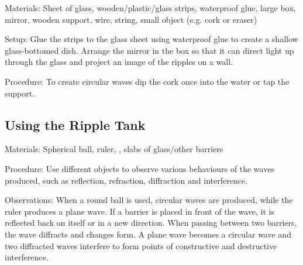 \begin{multicols}{2}
\begin{description*}
\item[Materials:]{Sheet of glass, wooden/plastic/glass strips, waterproof glue, large box, mirror, wooden support, wire, string, small object (e.g. cork or eraser)}
\item[Setup:]{Glue the strips to the glass sheet using waterproof glue to create a shallow glass-bottomed dish. Arrange the mirror in the box so that it can direct light up through the glass and project an image of the ripples on a wall.}
\item[Procedure:]{To create circular waves dip the cork once into the water or tap the support.}
\end{description*}

\subsection{Using the Ripple Tank}
\label{sub:rippletank}


\begin{description*}
\item[Materials:]{Spherical ball, ruler, , slabs of glass/other barriers}
\item[Procedure:]{Use different objects to observe various behaviours of the waves produced, such as reflection, refraction, diffraction and interference.}
\item[Observations:]{When a round ball is used, circular waves are produced, while the ruler produces a plane wave. If a barrier is placed in front of the wave, it is reflected back on itself or in a new direction. When passing between two barriers, the wave diffracts and changes form. A plane wave becomes a circular wave and two diffracted waves interfere to form points of constructive and destructive interference.}
\end{description*}


\end{multicols}
